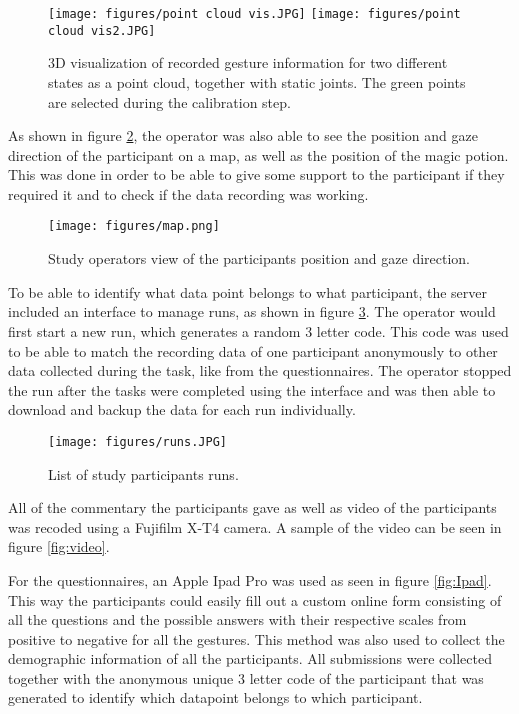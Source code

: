 \begin{figure}[!htb]
        \texttt{[image: figures/point cloud vis.JPG]}
        \label{fig:vis2}
    \endminipage\hfill
        \texttt{[image: figures/point cloud vis2.JPG]}
        \label{fig:vis}
    \endminipage\hfill
    \caption{3D visualization of recorded gesture information for two different states as a point cloud, together with static joints. The green points are selected during the calibration step.}
\end{figure}

As shown in figure \ref{fig:map}, the operator was also able to see the position and gaze direction of the participant on a map, as well as the position of the magic potion. This was done in order to be able to give some support to the participant if they required it and to check if the data recording was working. 

\begin{figure}[!ht]
    \centering
    \texttt{[image: figures/map.png]}
    \caption{Study operators view of the participants position and gaze direction.}
    \label{fig:map}
\end{figure}

To be able to identify what data point belongs to what participant, the server included an interface to manage runs, as shown in figure \ref{fig:runs}. The operator would first start a new run, which generates a random 3 letter code. This code was used to be able to match the recording data of one participant anonymously to other data collected during the task, like from the questionnaires. The operator stopped the run after the tasks were completed using the interface and was then able to download and backup the data for each run individually.

\begin{figure}[!ht]
    \centering
    \texttt{[image: figures/runs.JPG]}
    \caption{List of study participants runs.}
    \label{fig:runs}
\end{figure}

All of the commentary the participants gave as well as video of the participants was recoded using a Fujifilm X-T4 camera. A sample of the video can be seen in figure \ref{fig:video}.

For the questionnaires, an Apple Ipad Pro was used as seen in figure \ref{fig:Ipad}. This way the participants could easily fill out a custom online form consisting of all the questions and the possible answers with their respective scales from positive to negative for all the gestures. This method was also used to collect the demographic information of all the participants. All submissions were collected together with the anonymous unique 3 letter code of the participant that was generated to identify which datapoint belongs to which participant. 

